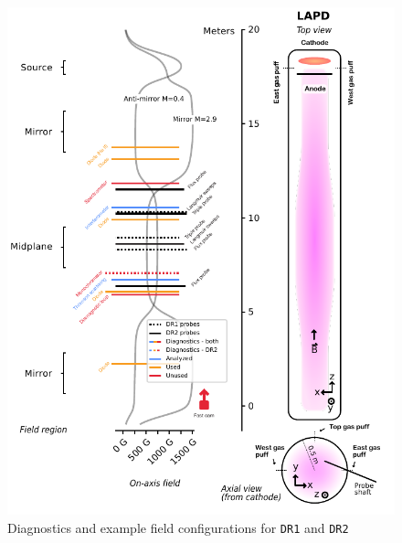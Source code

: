 \begin{figure}
	\centering
	\includegraphics[width=440pt]{figures/lapd-diagnostics.pdf}
	\caption[LAPD configuration and diagnostics for the ML datarun]{\label{fig:ml-lapd-diagnostics}Diagnostics and example field configurations for \texttt{DR1} and \texttt{DR2}}
\end{figure}

